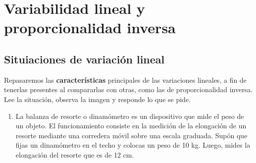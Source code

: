 \documentclass[11pt]{book}
\begin{document}
\section{Variabilidad lineal y proporcionalidad inversa}
\subsection{Situiaciones de variación lineal}
Repasaremos las \textbf{características} principales de las variaciones lineales, a fin de tenerlas presentes al
compararlas con otras, como las de proporcionalidad inversa. Lee la situación, observa la imagen y responde lo que se pide.
\begin{enumerate}
  \item La balanza de resorte o dinamómetro es un dispositivo que mide el peso de un objeto.
        El funcionamiento consiste en la medición de la elongación de un resorte mediante una corredera
        móvil sobre una escala graduada. Supón que fijas un dinamómetro en el techo y colocas un peso
        de 10 kg. Luego, mides la elongación del resorte que es de 12 cm.\\
        \begin{minipage}[t]{0.15\linewidth}
          \begin{figure}[H]
            \centering

\end{figure}
\end{minipage}
\end{enumerate}
\end{document}
